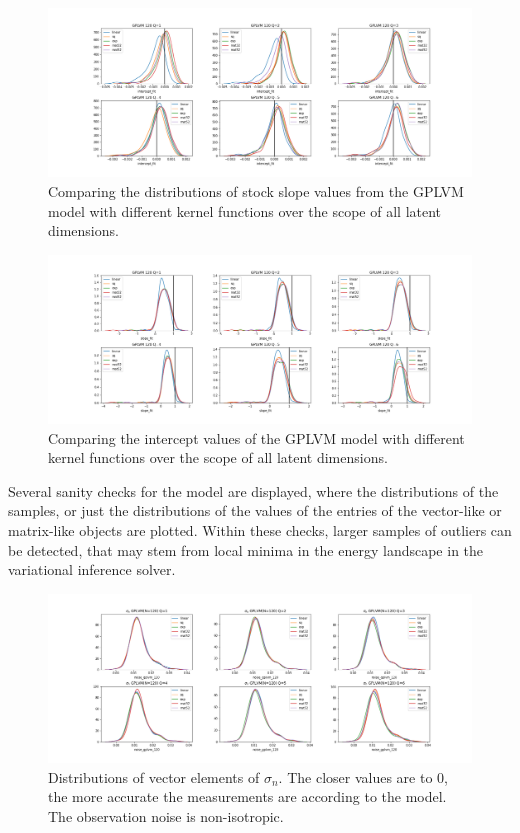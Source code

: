 \begin{figure}%
	\centering
	\includegraphics[width=7in]{img/07_0/intercept_fit_gplvm_120.png}
	\caption[Intercept Distributions for GPLVM]{Comparing the distributions of stock slope values from the GPLVM model with different kernel functions over the scope of all latent dimensions. }
	\label{fig:gplvm_intercepts}
\end{figure}
\begin{figure}%
	\centering
	\includegraphics[width=7in]{img/07_0/slope_fit_gplvm_120.png}
	\caption[Slope distributions for GPLVM]
	{Comparing the intercept values of the GPLVM model with different kernel functions over the scope of all latent dimensions. }
	\label{fig:gplvm_slopes}
\end{figure}
\newline \newline
Several sanity checks for the model are displayed, where the distributions of the samples, or just the distributions of the values of the entries of the vector-like or matrix-like objects are plotted. Within these checks, larger samples of outliers can be detected, that may stem from local minima in the energy landscape in the variational inference solver. 
\begin{figure}%
	\centering
	\includegraphics[width=7in]{img/07_0/noise_GPLVM_120.png}
	\caption[Signal Noise distributions GPLVM]
	{Distributions of vector elements of $\sigma_n$. The closer values are to 0, the more accurate the measurements are according to the model. The observation noise is non-isotropic.}
	\label{fig:gplvm_noises}
\end{figure}
